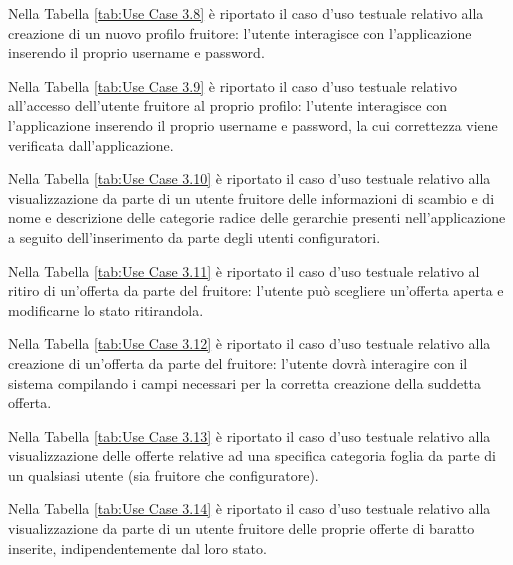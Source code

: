 Nella Tabella \ref{tab:Use Case 3.8} è riportato il caso d'uso testuale relativo alla creazione di un nuovo profilo fruitore: l'utente interagisce con l'applicazione inserendo il proprio username e password.\bigskip

Nella Tabella \ref{tab:Use Case 3.9} è riportato il caso d'uso testuale relativo all'accesso dell'utente fruitore al proprio profilo: l'utente interagisce con l'applicazione inserendo il proprio username e password, la cui correttezza viene verificata dall'applicazione.\bigskip

Nella Tabella \ref{tab:Use Case 3.10} è riportato il caso d'uso testuale relativo alla visualizzazione da parte di un utente fruitore delle informazioni di scambio e di nome e descrizione delle categorie radice delle gerarchie presenti nell'applicazione a seguito dell'inserimento da parte degli utenti configuratori.\bigskip

Nella Tabella \ref{tab:Use Case 3.11} è riportato il caso d'uso testuale relativo al ritiro di un'offerta da parte del fruitore: l'utente può scegliere un'offerta aperta e modificarne lo stato ritirandola.\bigskip

Nella Tabella \ref{tab:Use Case 3.12} è riportato il caso d'uso testuale relativo alla creazione di un'offerta da parte del fruitore: l'utente dovrà interagire con il sistema compilando i campi necessari per la corretta creazione della suddetta offerta.\bigskip

Nella Tabella \ref{tab:Use Case 3.13} è riportato il caso d'uso testuale relativo alla visualizzazione delle offerte relative ad una specifica categoria foglia da parte di un qualsiasi utente (sia fruitore che configuratore).\bigskip

Nella Tabella \ref{tab:Use Case 3.14} è riportato il caso d'uso testuale relativo alla visualizzazione da parte di un utente fruitore delle proprie offerte di baratto inserite, indipendentemente dal loro stato.\bigskip
